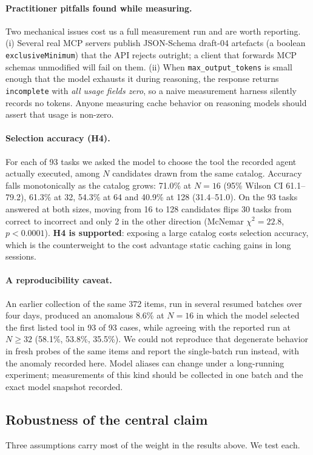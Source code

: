 \documentclass[11pt]{article}
\begin{document}
\paragraph{Practitioner pitfalls found while measuring.} Two mechanical issues cost us a full measurement run and are worth reporting. (i) Several real MCP servers publish JSON-Schema draft-04 artefacts (a boolean \texttt{exclusiveMinimum}) that the API rejects outright; a client that forwards MCP schemas unmodified will fail on them. (ii) When \texttt{max\_output\_tokens} is small enough that the model exhausts it during reasoning, the response returns \texttt{incomplete} with \emph{all usage fields zero}, so a naive measurement harness silently records no tokens. Anyone measuring cache behavior on reasoning models should assert that usage is non-zero.

\paragraph{Selection accuracy (H4).} For each of 93 tasks we asked the model to choose the tool the recorded agent actually executed, among $N$ candidates drawn from the same catalog. Accuracy falls monotonically as the catalog grows: 71.0\% at $N{=}16$ (95\% Wilson CI 61.1--79.2), 61.3\% at 32, 54.3\% at 64 and 40.9\% at 128 (31.4--51.0). On the 93 tasks answered at both sizes, moving from 16 to 128 candidates flips 30 tasks from correct to incorrect and only 2 in the other direction (McNemar $\chi^2 = 22.8$, $p < 0.0001$). \textbf{H4 is supported}: exposing a large catalog costs selection accuracy, which is the counterweight to the cost advantage static caching gains in long sessions.

\paragraph{A reproducibility caveat.} An earlier collection of the same 372 items, run in several resumed batches over four days, produced an anomalous 8.6\% at $N{=}16$ in which the model selected the first listed tool in 93 of 93 cases, while agreeing with the reported run at $N \geq 32$ (58.1\%, 53.8\%, 35.5\%). We could not reproduce that degenerate behavior in fresh probes of the same items and report the single-batch run instead, with the anomaly recorded here. Model aliases can change under a long-running experiment; measurements of this kind should be collected in one batch and the exact model snapshot recorded.

\subsection{Robustness of the central claim}
\label{sec:robust}
Three assumptions carry most of the weight in the results above. We test each.
\end{document}
